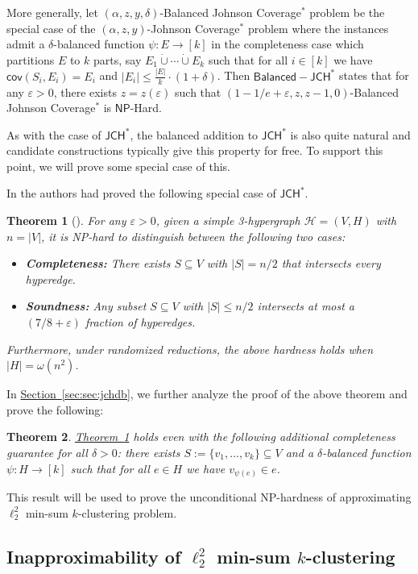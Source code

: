 \documentclass[11pt]{article}
\newtheorem{theorem}{Theorem}[section]
\newcommand{\namedref}[2]{\hyperref[#2]{#1~\ref*{#2}}}
\newcommand{\thmlab}[1]{\label{thm:#1}}
\newcommand{\thmref}[1]{\namedref{Theorem}{thm:#1}}
\newcommand{\seclab}[1]{\label{sec:#1}}
\newcommand{\secref}[1]{\namedref{Section}{sec:#1}}
\newcommand{\eps}{\varepsilon}
\newcommand{\con}{\mathsf{cov}}
\newcommand{\JCHD}{$\mathsf{JCH}^*$\xspace}
\newcommand{\JCHDB}{$\mathsf{Balanced-JCH}^*$\xspace}
\newcommand{\jcd}{Johnson Coverage$^*$\xspace}
\newcommand{\jcdb}{Balanced Johnson Coverage$^*$\xspace}
\newcommand{\NP}{$\mathsf{NP}$\xspace}
\begin{document}
More generally, let $(\alpha, z, y,\delta)$-\jcdb problem be the special case of the 
$(\alpha, z, y)$-\jcd problem where the instances admit a $\delta$-balanced function $\psi:E\to [k]$ in the completeness case which  partitions $E$ to $k$ parts, say $E_1\dot\cup \cdots \dot\cup E_k$ such that for all $i\in[k]$ we have $\con(S_i,E_i)=E_i$ and $|E_i|\le \frac{|E|}{k}\cdot (1+\delta)$. 
Then \JCHDB states that for any $\eps > 0$, there exists $z = z(\eps)$ such that 
$(1-1/e + \eps, z, z-1,0)$-\jcdb is \NP-Hard.

As with the case of \JCHD, the balanced addition to \JCHD is also quite natural and candidate constructions typically give this property for free. To support this point, we will prove some special case of this. 


In \cite{Cohen-AddadSL22} the authors had proved the following special case of \JCHD. 


\begin{theorem}[\cite{Cohen-AddadSL22}]
\thmlab{thm:CKLNP}
For any $\eps > 0$, given a simple 3-hypergraph $\mathcal{H} = (V, H)$ with $n = |V|$, it is NP-hard to distinguish between the following two cases:
\label{thm:np-hard}
\begin{itemize}
\item {\bf Completeness:} There exists $S \subseteq V$ with $|S| = n/2$ that intersects every hyperedge. 
\item {\bf Soundness:} Any subset $S \subseteq V$ with $|S| \leq n/2$ intersects at most a $(7/8 + \eps)$ fraction of hyperedges. 
\end{itemize}
Furthermore, under randomized reductions, the above hardness holds when $|H| = \omega(n^2)$. 
\label{thm:hvc}
\end{theorem}

In \secref{sec:jchdb}, we further analyze the proof of the above theorem and prove the following:

\begin{theorem}
\thmlab{thm:minsumNP}
\thmref{thm:CKLNP} holds even with the following additional completeness guarantee for all $\delta>0$: there   exists $S:=\{v_1,\ldots ,v_k\}\subseteq  V$  and a $\delta$-balanced function $\psi:H\to [k]$ such that for all $e\in H$ we have $v_{\psi(e)}\in e$.
\end{theorem}

This result will be used to prove the unconditional NP-hardness of approximating $\ell_2^2$ min-sum $k$-clustering problem.

\subsection{Inapproximability of \texorpdfstring{$\ell_2^2$}{L22} min-sum \texorpdfstring{$k$}{k}-clustering}
\seclab{sec:inapprox}
 
\end{document}
